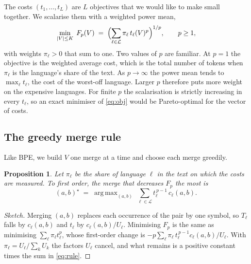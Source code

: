 \documentclass[11pt,a4paper]{article}
\newtheorem{proposition}{Proposition}
\theoremstyle{remark}
\DeclareMathOperator*{\argmax}{arg\,max}
\begin{document}
The costs $(t_1,\dots,t_L)$ are $L$ objectives that we would like to make small together. We
scalarise them with a weighted power mean,
\begin{equation}\label{eq:obj}
  \min_{|V|\le K}\; F_p(V) \;=\; \Bigl(\sum_{\ell\in\mathcal{L}} \pi_\ell\, t_\ell(V)^{p}\Bigr)^{1/p},
  \qquad p\ge 1,
\end{equation}
with weights $\pi_\ell>0$ that sum to one. Two values of $p$ are familiar. At $p=1$ the
objective is the weighted average cost, which is the total number of tokens when $\pi_\ell$
is the language's share of the text. As $p\to\infty$ the power mean tends to
$\max_\ell t_\ell$, the cost of the worst-off language. Larger $p$ therefore puts more
weight on the expensive languages. For finite $p$ the scalarisation is strictly increasing
in every $t_\ell$, so an exact minimiser of \eqref{eq:obj} would be Pareto-optimal for the
vector of costs.

\subsection{The greedy merge rule}\label{sec:rule}

Like BPE, we build $V$ one merge at a time and choose each merge greedily.

\begin{proposition}\label{prop:rule}
Let $\pi_\ell$ be the share of language $\ell$ in the text on which the costs are measured.
To first order, the merge that decreases $F_p$ the most is
\begin{equation}\label{eq:rule}
  (a,b)^\star \;=\; \argmax_{(a,b)}\; \sum_{\ell\in\mathcal{L}} t_\ell^{\,p-1}\, c_\ell(a,b).
\end{equation}
\end{proposition}

\begin{proof}[Sketch]
Merging $(a,b)$ replaces each occurrence of the pair by one symbol, so $T_\ell$ falls by
$c_\ell(a,b)$ and $t_\ell$ by $c_\ell(a,b)/U_\ell$. Minimising $F_p$ is the same as
minimising $\sum_\ell \pi_\ell t_\ell^p$, whose first-order change is
$-p\sum_\ell \pi_\ell\, t_\ell^{\,p-1} c_\ell(a,b)/U_\ell$. With
$\pi_\ell = U_\ell/\sum_k U_k$ the factors $U_\ell$ cancel, and what remains is a positive
constant times the sum in \eqref{eq:rule}.
\end{proof}
\end{document}
